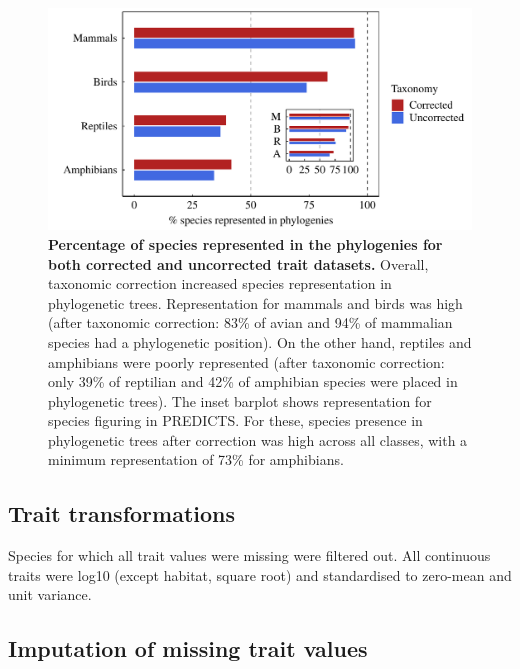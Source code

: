 \begin{figure}[h!]
\centering
\includegraphics[scale=0.7]{figures/chapter2/Species_representation_phylo}
\caption[Percentage of species represented in the phylogenies for both corrected and uncorrected trait datasets]{\textbf{Percentage of species represented in the phylogenies for both corrected and uncorrected trait datasets.} Overall, taxonomic correction increased species representation in phylogenetic trees. Representation for mammals and birds was high (after taxonomic correction: 83\% of avian and 94\% of mammalian species had a phylogenetic position). On the other hand, reptiles and amphibians were poorly represented (after taxonomic correction: only 39\% of reptilian and 42\% of amphibian species were placed in phylogenetic trees). The inset barplot shows representation for species figuring in PREDICTS. For these, species presence in phylogenetic trees after correction was high across all classes, with a minimum representation of 73\% for amphibians.}
\label{species_rep_phylo}
\end{figure}


\subsection{Trait transformations}
Species for which all trait values were missing were filtered out. All continuous traits were log10 (except habitat, square root) and standardised to zero-mean and unit variance.


\subsection{Imputation of missing trait values}



